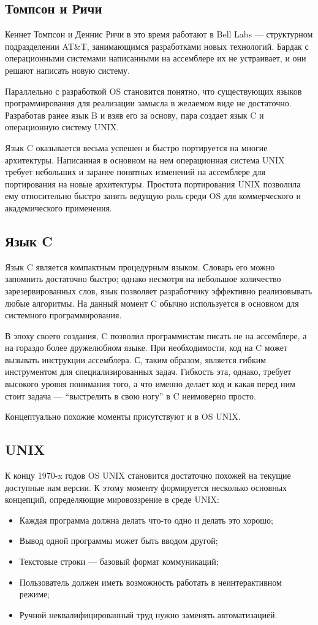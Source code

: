 \subsection{Томпсон и Ричи}
Кеннет Томпсон и Деннис Ричи в это время работают в Bell Labs --- структурном подразделении AT\&T, занимающимся разработками новых технологий. Бардак с операционными системами написанными на ассемблере их не устраивает, и они решают написать новую систему.

Параллельно с разработкой OS становится понятно, что существующих языков программирования для реализации замысла в желаемом виде не достаточно.
Разработав ранее язык B и взяв его за основу, пара создает язык C и операционную систему UNIX.

Язык C оказывается весьма успешен и быстро портируется на многие архитектуры. Написанная в основном на нем операционная система UNIX требует небольших и заранее понятных изменений на ассемблере для портирования на новые архитектуры. Простота портирования UNIX позволила ему относительно быстро занять ведущую роль среди OS для коммерческого и академического применения.

\subsection{Язык C}
Язык C является компактным процедурным языком. Словарь его можно запомнить достаточно быстро; однако несмотря на небольшое количество зарезервированных слов, язык позволяет разработчику эффективно реализовывать любые алгоритмы. На данный момент C обычно используется в основном для системного программирования.

В эпоху своего создания, C позволил программистам писать не на ассемблере, а на гораздо более дружелюбном языке. При необходимости, код на C может вызывать инструкции ассемблера. С, таким образом, является гибким инструментом для специализированных задач. Гибкость эта, однако, требует высокого уровня понимания того, а что именно делает код и какая перед ним стоит задача --- \enquote{выстрелить в свою ногу} в C неимоверно просто.

Концептуально похожие моменты присутствуют и в OS UNIX.

\subsection{UNIX}
К концу 1970-x годов OS UNIX становится достаточно похожей на текущие доступные нам версии. К этому моменту формируется несколько основных концепций, определяющие мировоззрение в среде UNIX:
\begin{itemize}
  \item Каждая программа должна делать что-то одно и делать это хорошо;
  \item Вывод одной программы может быть вводом другой;
  \item Текстовые строки --- базовый формат коммуникаций;
  \item Пользователь должен иметь возможность работать в неинтерактивном режиме;
  \item Ручной неквалифицированный труд нужно заменять автоматизацией.
\end{itemize}

